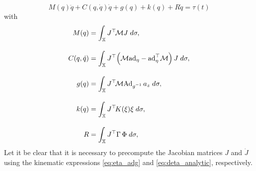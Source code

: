 \begin{equation}
M(q) \ddot{q} + C(q,\dot{q}) \dot{q} + g(q) + k(q) + R\dot{q} = \tau(t)	
\end{equation}
 with 
%
\begin{align}
M(q) & = \int_\Xs J^\top\! \mathcal{M} J \; d\sigma, \\[1.0em]
C(q,\dot{q}) & = \int_\Xs J^\top\! \left( \mathcal{M} \ad_{\eta} - \ad_{\eta}^\top \mathcal{M} \right)J \; d\sigma, \label{eq:coriolis_lag}\\[1.0em]
g(q) & = \int_\Xs J^\top\! \mathcal{M} \Ad_{g\inv}\,a_z \; d\sigma, \\[1.0em]
k(q) & = \int_\Xs J^\top\! K(\xi) \xi\; d\sigma, \\[1.0em]
R & = \int_\Xs J^\top\! \,\Gamma \,\Phi\; d\sigma, 
\end{align}
%
Let it be clear that it is necessary to precompute the Jacobian matrices $J$ and $\dot{J}$ using the kinematic expressions \eqref{eq:eta_adg} and \eqref{eq:deta_analytic}, respectively. 


